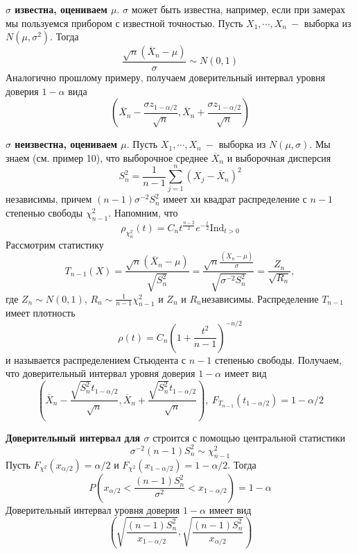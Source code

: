\par
\textbf{$\sigma $ известна, оцениваем $\mu$}. $\sigma$ может быть известна, например, если при замерах мы пользуемся прибором с известной точностью. Пусть $X_1, \cdots, X_n \ - $ выборка из $N\left(\mu, \sigma ^ 2\right)$. Тогда 
\[
    \frac{\sqrt{n}\left(\overline{X}_n - \mu\right)}{\sigma} \sim N\left(0, 1\right)
\]
Аналогично прошлому примеру, получаем доверительный интервал уровня доверия $1 - \alpha$ вида
\[
    \left(\overline{X}_n - \frac{\sigma z_{1-\alpha/2}}{\sqrt{n}}, \overline{X}_n + \frac{\sigma z_{1-\alpha/2}}{\sqrt{n}}\right)
\]
\par
\textbf{$\sigma$ неизвестна, оцениваем $\mu$}. Пусть $X_1, \cdots, X_n \ -$ выборка из $N\left(\mu, \sigma\right)$. Мы знаем (см. пример 10), что выборочное среднее $\overline{X}_n$ и выборочная дисперсия
\[
    S_n ^ 2 = \frac1{n - 1} \sum_{j=1}^{n} \left(X_j - \overline{X}_n\right) ^ 2
\]
независимы, причем $\left(n - 1\right)\sigma ^ {-2} S_n ^ 2$ имеет хи квадрат распределение с $n - 1$ степенью свободы $\chi^2_{n-1}$. Напомним, что
\[
    \rho_{\chi^2_{n}}\left(t\right) = C_n t ^ {\frac{n-2}2} e ^ {-\frac{t}2} \text{Ind}_{t > 0}
\]
Рассмотрим статистику
\[
    T_{n-1}\left(X\right) =\frac{\sqrt{n}\left(\overline{X}_n - \mu\right)}{\sqrt{S_n ^ 2}} = \frac{\sqrt{n}\frac{\left(\overline{X}_n - \mu\right)}{\sigma}}{\sqrt{\sigma ^{-2} S_n ^ 2}} = \frac{Z_n}{\sqrt{R_n}},
\]
где $Z_n \sim N\left(0, 1\right)$, $R_n \sim \frac 1 {n-1} \chi^2_{n-1}$ и $Z_n$ и $R_n$независимы. Распределение $T_{n-1}$ имеет плотность 
\[
    \rho\left(t\right) = C_n \left(1 + \frac{t^2}{n - 1}\right) ^ {-n/2}
\]
и называется распределением Стьюдента с $n - 1$ степенью свободы. Получаем, что доверительный интервал уровня доверия $1 - \alpha$ имеет вид
\[
    \left(\overline{X}_n - \frac{\sqrt{S^2_n} t_{1-\alpha/2}}{\sqrt n}, \overline{X}_n + \frac{\sqrt{S^2_n} t_{1-\alpha/2}}{\sqrt n}\right), \ F_{T_{n-1}}\left(t_{1-\alpha/2}\right) = 1-\alpha/2
\]
\par
\textbf{Доверительный интервал для $\sigma$} строится с помощью центральной статистики
\[
    \sigma ^ {-2}\left(n - 1\right)S_n ^ 2 \sim \chi_{n-1}^2
\]
Пусть $F_{\chi^2}\left(x_{\alpha/2}\right) = \alpha/2$ и $F_{\chi^2}\left(x_{1-\alpha/2}\right) = 1-\alpha/2$. Тогда 
\[
    P\left(x_{\alpha/2} < \frac{\left(n-1\right) S^2_n}{\sigma^2} < x_{1-\alpha/2}\right) = 1 - \alpha
\]
Доверительный интервал уровня доверия $1 - \alpha$ имеет вид
\[
    \left(\sqrt{\frac{\left(n-1\right) S^2_n}{x_{1-\alpha/2}}}, \sqrt{\frac{\left(n-1\right) S^2_n}{x_{\alpha/2}}}\right)
\]
\clearpage

